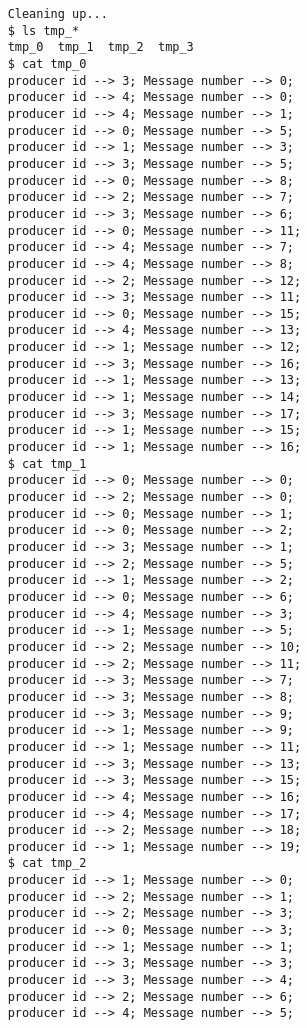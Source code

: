 \documentclass[11pt]{article}
\begin{document}
\begin{question}
\begin{subquestion}
\begin{itemize}
{\begin{verbatim}
    Cleaning up...
    $ ls tmp_*
    tmp_0  tmp_1  tmp_2  tmp_3
    $ cat tmp_0
    producer id --> 3; Message number --> 0;
    producer id --> 4; Message number --> 0;
    producer id --> 4; Message number --> 1;
    producer id --> 0; Message number --> 5;
    producer id --> 1; Message number --> 3;
    producer id --> 3; Message number --> 5;
    producer id --> 0; Message number --> 8;
    producer id --> 2; Message number --> 7;
    producer id --> 3; Message number --> 6;
    producer id --> 0; Message number --> 11;
    producer id --> 4; Message number --> 7;
    producer id --> 4; Message number --> 8;
    producer id --> 2; Message number --> 12;
    producer id --> 3; Message number --> 11;
    producer id --> 0; Message number --> 15;
    producer id --> 4; Message number --> 13;
    producer id --> 1; Message number --> 12;
    producer id --> 3; Message number --> 16;
    producer id --> 1; Message number --> 13;
    producer id --> 1; Message number --> 14;
    producer id --> 3; Message number --> 17;
    producer id --> 1; Message number --> 15;
    producer id --> 1; Message number --> 16;
    $ cat tmp_1
    producer id --> 0; Message number --> 0;
    producer id --> 2; Message number --> 0;
    producer id --> 0; Message number --> 1;
    producer id --> 0; Message number --> 2;
    producer id --> 3; Message number --> 1;
    producer id --> 2; Message number --> 5;
    producer id --> 1; Message number --> 2;
    producer id --> 0; Message number --> 6;
    producer id --> 4; Message number --> 3;
    producer id --> 1; Message number --> 5;
    producer id --> 2; Message number --> 10;
    producer id --> 2; Message number --> 11;
    producer id --> 3; Message number --> 7;
    producer id --> 3; Message number --> 8;
    producer id --> 3; Message number --> 9;
    producer id --> 1; Message number --> 9;
    producer id --> 1; Message number --> 11;
    producer id --> 3; Message number --> 13;
    producer id --> 3; Message number --> 15;
    producer id --> 4; Message number --> 16;
    producer id --> 4; Message number --> 17;
    producer id --> 2; Message number --> 18;
    producer id --> 1; Message number --> 19;
    $ cat tmp_2
    producer id --> 1; Message number --> 0;
    producer id --> 2; Message number --> 1;
    producer id --> 2; Message number --> 3;
    producer id --> 0; Message number --> 3;
    producer id --> 1; Message number --> 1;
    producer id --> 3; Message number --> 3;
    producer id --> 3; Message number --> 4;
    producer id --> 2; Message number --> 6;
    producer id --> 4; Message number --> 5;

\end{verbatim}}
\end{itemize}
\end{subquestion}
\end{question}
\end{document}
